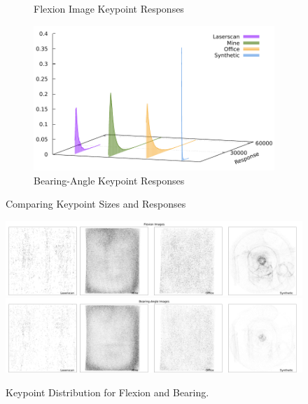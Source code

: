\begin{figure}[H]
\begin{subfigure}[t]{0.45\linewidth}
    \caption{Flexion Image Keypoint Responses}
\end{subfigure}\quad
\begin{subfigure}[t]{0.45\linewidth}
    \includegraphics[width=\linewidth]{chapter06/results/SURF/bearing/response.pdf}
    \caption{Bearing-Angle Keypoint Responses}
\end{subfigure}
    \caption{Comparing Keypoint Sizes and Responses}
\end{figure}
\begin{figure}[H]
    \includegraphics[width=\linewidth]{chapter06/results/SURF/flexion/distribution.pdf}\\
    \includegraphics[width=\linewidth]{chapter06/results/SURF/bearing/distribution.pdf}%
    \caption{Keypoint Distribution for Flexion and Bearing.}
\end{figure}
